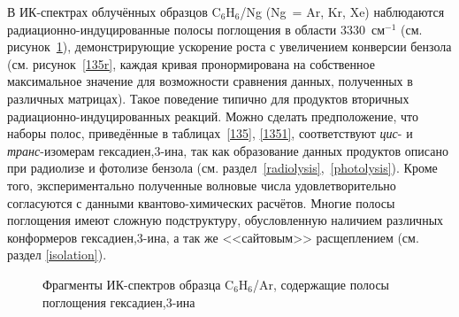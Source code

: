 {В ИК-спектрах облучённых образцов C$_6$H$_6$/Ng (Ng~= Ar, Kr, Xe) наблюдаются радиационно-индуцированные полосы поглощения в области 3330~см$^{-1}$ (см. рисунок~\ref{135_}), демонстрирующие ускорение роста с увеличением конверсии бензола (см. рисунок~\ref{135r}, каждая кривая пронормирована на собственное максимальное значение для возможности сравнения данных, полученных в различных матрицах). Такое поведение типично для продуктов вторичных радиационно-индуцированных реакций. Можно сделать предположение, что наборы полос, приведённые в таблицах~\ref{135}, \ref{1351}, соответствуют {\it цис}- и {\it транс}-изомерам гексадиен,3\nobreakdash-ина, так как образование данных продуктов описано при радиолизе и фотолизе бензола (см. раздел~\ref{radiolysis},~\ref{photolysis}). Кроме того, экспериментально полученные волновые числа удовлетворительно согласуются с данными квантово-химических расчётов. Многие полосы поглощения имеют сложную подструктуру, обусловленную наличием различных конформеров гексадиен,3\nobreakdash-ина, а так же <<сайтовым>> расщеплением (см. раздел \ref{isolation}).

 \begin{figure}[H]
\caption{Фрагменты ИК-спектров образца C$_6$H$_6$/Ar, содержащие полосы поглощения гексадиен,3\nobreakdash-ина}
\label{135_}
\end{figure}

}
